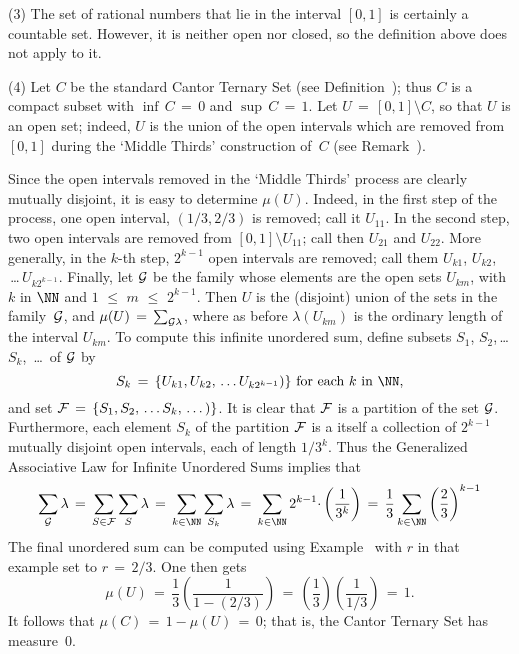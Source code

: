 \V

        (3) The set of rational numbers that lie in the interval $[0,1]$ is certainly a countable set.
    However, it is neither open nor closed, so the definition above does not apply to it.

\V

        (4) Let $C$ be the standard Cantor Ternary Set (see Definition~);
    thus $C$ is a compact subset with ${\inf}\,C \,=\, 0$ and ${\sup}\,C \,=\, 1$.
    Let $U \,=\, [0,1]{\setminus}C$, so that $U$ is an open set; indeed, $U$ is the union of the open intervals which are removed from $[0,1]$
    during the `Middle Thirds' construction of~$C$ (see Remark~).

    Since the open intervals removed in the `Middle Thirds' process are clearly mutually disjoint,
    it is easy to determine ${\mu}(U)$.
    Indeed, in the first step of the process, one open interval, $(1/3,2/3)$ is removed; call it $U_{11}$.
    In the second step, two open intervals are removed from $[0,1]{\setminus}U_{11}$;
    call then $U_{21}$ and $U_{22}$.
    More generally, in the $k$-th step, $2^{k-1}$ open intervals are removed; call them $U_{k1}$, $U_{k2}$, \,{\ldots}\,$U_{k2^{k-1}}$.
    Finally, let ${\cal G}$ be the family whose elements are the open sets $U_{km}$,
    with $k$ in ${\NN}$ and $1\,\,{\leq}\,\,m\,\,{\leq}\,\,2^{k-1}$.
    Then $U$ is the (disjoint) union of the sets in the family~${\cal G}$, and ${\mu}(U) \,=\, \sum_{{\cal G} {\lambda}}$, where as before ${\lambda}(U_{km})$ is the ordinary length of the interval $U_{km}$.
    To compute this infinite unordered sum, define subsets $S_{1}$, $S_{2}$,\,{\ldots}\,$S_{k}$, \,{\ldots}\, of ${\cal G}$ by
        \begin{displaymath}
        S_{k} \,=\, \left\{U_{k1}, U_{k2},\,{\ldots}\,U_{k2^{k-1}}\right)\} \mbox{ for each $k$ in ${\NN}$},
        \end{displaymath}
    and set ${\cal F} \,=\, \left\{S_{1}, S_{2},\,{\ldots}\,S_{k},\,{\ldots}\,\right)\}$.
    It is clear that ${\cal F}$ is a partition of the set ${\cal G}$. Furthermore, each element $S_{k}$ of the partition ${\cal F}$ is a itself a collection of $2^{k-1}$ mutually disjoint open intervals, each of length $1/3^{k}$.
    Thus the Generalized Associative Law for Infinite Unordered Sums implies that
        \begin{displaymath}
        \sum_{{\cal G}} {\lambda}  \,=\, \sum_{S{\in}{\cal F}} \sum_{S}{\lambda} \,=\, \sum_{k{\in}{\NN}} \sum_{S_{k}} {\lambda} \,=\, 
    \sum_{k{\in}{\NN}} 2^{k-1}{\cdot}\left(\frac{1}{3^{k}}\right) \,=\, \frac{1}{3}\sum_{k{\in}{\NN}} \left(\frac{2}{3}\right)^{k-1}
        \end{displaymath}
    The final unordered sum can be computed using Example~ with $r$ in that example set to $r \,=\, 2/3$.
    One then gets
        \begin{displaymath}
        {\mu}(U) \,=\, \frac{1}{3}\left(\frac{1}{1-(2/3)}\right) \,=\, \left(\frac{1}{3}\right)\left(\frac{1}{1/3}\right) \,=\, 1.
        \end{displaymath}
    It follows that ${\mu}(C) \,=\, 1-{\mu}(U) \,=\, 0$; that is, the Cantor Ternary Set has measure~$0$.

